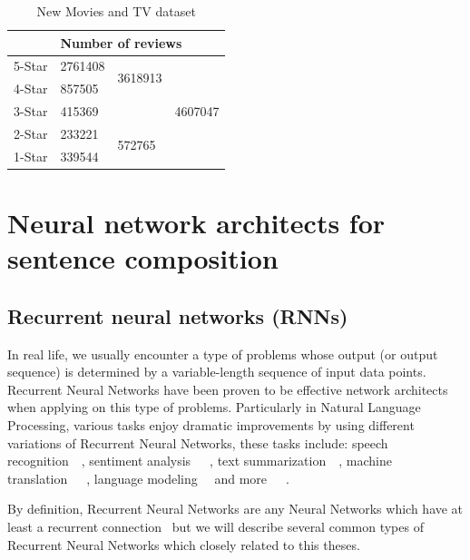 \begin{table}[H]
    \centering
    \caption{New Movies and TV dataset}
    \label{table:moviereview}
    \begin{tabular}{@{}lllc@{}}
        \toprule
        & \multicolumn{3}{l}{Number of reviews}                         \\ \midrule
        5-Star & 2761408 & \multirow{2}{*}{3618913} & \multirow{5}{*}{4607047} \\ \cmidrule(r){1-2}
        4-Star & 857505  &                          &                          \\ \cmidrule(r){1-3}
        3-Star & \multicolumn{2}{l}{415369}         &                          \\ \cmidrule(r){1-3}
        2-Star & 233221  & \multirow{2}{*}{572765}  &                          \\ \cmidrule(r){1-2}
        1-Star & 339544  &                          &                          \\ \bottomrule
    \end{tabular}
\end{table}


\section{Neural network architects for sentence composition}\label{sec:composer}
\subsection{Recurrent neural networks (RNNs)}\label{sec:RNN}
In real life, we usually encounter a type of problems whose output (or output sequence) is determined by a variable-length sequence of input data points. 
Recurrent Neural Networks have been proven to be effective network architects when applying on this type of problems.  
Particularly in Natural Language Processing, various tasks enjoy dramatic improvements by using different variations of Recurrent Neural Networks, these tasks include:  speech recognition~\cite{speech-lstm}~\cite{MiaoGM15}, sentiment analysis~\cite{treeLSTM}~\cite{cnn-rnn}~\cite{attention-gru}, text summarization~\cite{RushCW15}~\cite{NallapatiXZ16}, machine translation~\cite{FiratCB16}~\cite{SutskeverVL14}~\cite{BritzGLL17}, language modeling~\cite{mikolov-nlm}~\cite{JozefowiczVSSW16} and more~\cite{deep-nlp}~\cite{Schmidhuber14}~\cite{deeplearning-book}.

By definition, Recurrent Neural Networks are any Neural Networks which have at least a recurrent connection~\cite{rnn-def} but we will describe several common types of Recurrent Neural Networks which closely related to this theses.

